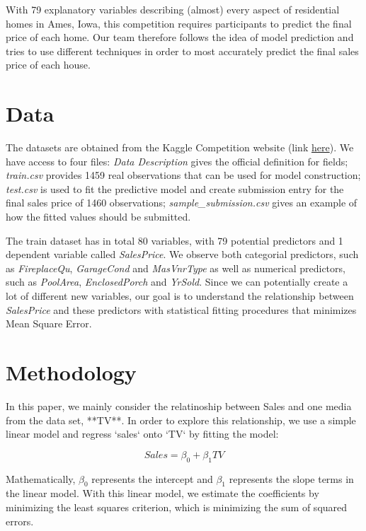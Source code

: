 \documentclass[a4paper]{article}
\begin{document}
With 79 explanatory variables describing (almost) every aspect of residential homes in Ames, Iowa, this competition requires participants to predict the final price of each home. Our team therefore follows the idea of model prediction and tries to use different techniques in order to most accurately predict the final sales price of each house. \par


\section{Data}
The datasets are obtained from the Kaggle Competition website (link \href{https://www.kaggle.com/c/house-prices-advanced-regression-techniques/data}{here}). We have access to four files: \textit{Data Description} gives the official definition for fields; \textit{train.csv} provides 1459 real observations that can be used for model construction; \textit{test.csv} is used to fit the predictive model and create submission entry for the final sales price of 1460 observations; \textit{sample_submission.csv} gives an example of how the fitted values should be submitted. \par

The train dataset has in total 80 variables, with 79 potential predictors and 1 dependent variable called \textit{SalesPrice}. We observe both categorial predictors, such as \textit{FireplaceQu}, \textit{GarageCond} and \textit{MasVnrType} as well as numerical predictors, such as \textit{PoolArea}, \textit{EnclosedPorch} and \textit{YrSold}. Since we can potentially create a lot of different new variables, our goal is to understand the relationship between \textit{SalesPrice} and these predictors with statistical fitting procedures that minimizes Mean Square Error. \par

\section{Methodology}
In this paper, we mainly consider the relatinoship between Sales and one media from the data set, **TV**. In order to explore this relationship, we use a simple linear model and regress `sales` onto `TV` by fitting the model:

\begin{equation}
Sales = \beta_0 + \beta_1 TV
\end{equation}

Mathematically, $\beta_0$ represents the intercept and $\beta_1$ represents the slope terms in the linear model. With this linear model, we estimate the coefficients by minimizing the least squares criterion, which is minimizing the sum of squared errors.
\end{document}
